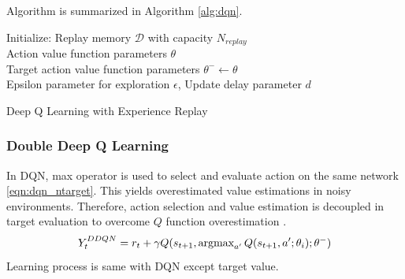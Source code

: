 Algorithm is summarized in Algorithm \ref{alg:dqn}. \\
\begin{algorithm}[H]
	\SetAlgoLined
	\DontPrintSemicolon %
	Initialize: Replay memory $\mathcal{D}$ with capacity $N_{replay}$ \\
	Action value function parameters $\theta$ \\
	Target action value function parameters $\theta^- \leftarrow \theta$ \\
	Epsilon parameter for exploration $\epsilon$, Update delay parameter $d$ \\
	\caption{Deep Q Learning with Experience Replay}
	\label{alg:dqn}
\end{algorithm}
\subsubsection{Double Deep Q Learning}
In DQN, max operator is used to select and evaluate action on the same network \eqref{eqn:dqn_ntarget}. This yields overestimated value estimations in noisy environments. Therefore, action selection and value estimation is decoupled in target evaluation to overcome $Q$ function overestimation \cite{van_hasselt_deep_2015}. \\
\begin{equation}
\label{eqn:ddqn_ntarget}
Y_t^{DDQN} = r_t + \gamma Q(s_{t+1}, \operatorname{\textup{argmax}}_{a'} Q(s_{t+1}, a'; \theta_i );\theta^-)
\end{equation}
Learning process is same with DQN except target value. \\
